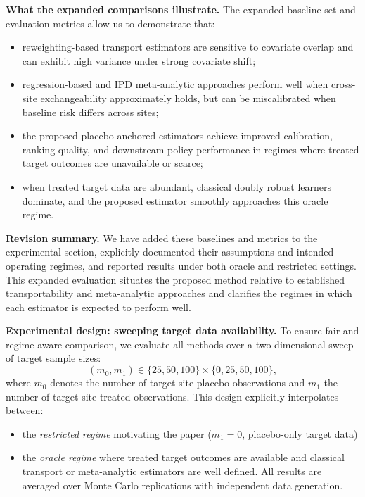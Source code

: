 {{\color{blue}
\medskip
\noindent
\textbf{What the expanded comparisons illustrate.}
The expanded baseline set and evaluation metrics allow us to demonstrate that:
\begin{itemize}
\item reweighting-based transport estimators are sensitive to covariate overlap and can exhibit high variance under strong covariate shift;
\item regression-based and IPD meta-analytic approaches perform well when cross-site exchangeability approximately holds, but can be miscalibrated when baseline risk differs across sites;
\item the proposed placebo-anchored estimators achieve improved calibration, ranking quality, and downstream policy performance in regimes where treated target outcomes are unavailable or scarce;
\item when treated target data are abundant, classical doubly robust learners dominate, and the proposed estimator smoothly approaches this oracle regime.
\end{itemize}

\medskip
\noindent
\textbf{Revision summary.}
We have added these baselines and metrics to the experimental section, explicitly documented their assumptions and intended operating regimes, and reported results under both oracle and restricted settings. This expanded evaluation situates the proposed method relative to established transportability and meta-analytic approaches and clarifies the regimes in which each estimator is expected to perform well.

\textbf{Experimental design: sweeping target data availability.}
To ensure fair and regime-aware comparison, we evaluate all methods over a two-dimensional sweep of target sample sizes:
\[
(m_0,m_1)\in\{25,50,100\}\times\{0,25,50,100\},
\]
where $m_0$ denotes the number of target-site placebo observations and $m_1$ the number of target-site treated observations.
This design explicitly interpolates between:
\begin{itemize}
    \item the \emph{restricted regime} motivating the paper ($m_1=0$, placebo-only target data)
    \item the \emph{oracle regime} where treated target outcomes are available and classical transport or meta-analytic estimators are well defined.
All results are averaged over Monte Carlo replications with independent data generation.
\end{itemize}

}}
